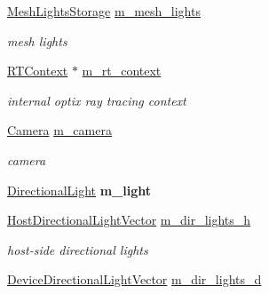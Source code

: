 \begin{DoxyCompactItemize}
\hyperlink{struct_mesh_lights_storage}{Mesh\+Lights\+Storage} \hyperlink{struct_rendering_context_impl_a77836a03b00ec8a772550cb0135b3c47}{m\+\_\+mesh\+\_\+lights}
\begin{DoxyCompactList}\small\item\em mesh lights \end{DoxyCompactList}\item 
\mbox{\label{struct_rendering_context_impl_ab3dfe96b7797317880756b7b6b385dbd}} 
\hyperlink{struct_r_t_context}{R\+T\+Context} $\ast$ \hyperlink{struct_rendering_context_impl_ab3dfe96b7797317880756b7b6b385dbd}{m\+\_\+rt\+\_\+context}
\begin{DoxyCompactList}\small\item\em internal optix ray tracing context \end{DoxyCompactList}\item 
\mbox{\label{struct_rendering_context_impl_a4718a91d360f194831cc8c782d4ccd7d}} 
\hyperlink{struct_camera}{Camera} \hyperlink{struct_rendering_context_impl_a4718a91d360f194831cc8c782d4ccd7d}{m\+\_\+camera}
\begin{DoxyCompactList}\small\item\em camera \end{DoxyCompactList}\item 
\mbox{\label{struct_rendering_context_impl_a6f941d21101655cbbb7f04ab6a3f4e96}} 
\hyperlink{struct_directional_light}{Directional\+Light} {\bfseries m\+\_\+light}
\item 
\mbox{\label{struct_rendering_context_impl_a75e7a4755cd5db921f83cc6c0adf12b0}} 
\hyperlink{class_domain_buffer}{Host\+Directional\+Light\+Vector} \hyperlink{struct_rendering_context_impl_a75e7a4755cd5db921f83cc6c0adf12b0}{m\+\_\+dir\+\_\+lights\+\_\+h}
\begin{DoxyCompactList}\small\item\em host-\/side directional lights \end{DoxyCompactList}\item 
\mbox{\label{struct_rendering_context_impl_a5ca656b451f9c39e20081dcda1a6d182}} 
\hyperlink{class_domain_buffer}{Device\+Directional\+Light\+Vector} \hyperlink{struct_rendering_context_impl_a5ca656b451f9c39e20081dcda1a6d182}{m\+\_\+dir\+\_\+lights\+\_\+d}

\end{DoxyCompactItemize}
